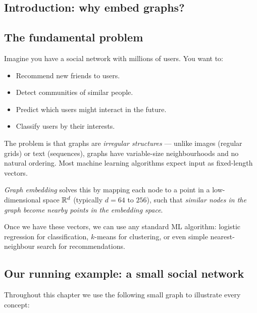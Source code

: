 \begin{notechapter}
\section{Introduction: why embed graphs?}

\subsection{The fundamental problem}

Imagine you have a social network with millions of users. You want to:
\begin{itemize}
    \item Recommend new friends to users.
    \item Detect communities of similar people.
    \item Predict which users might interact in the future.
    \item Classify users by their interests.
\end{itemize}

The problem is that graphs are \emph{irregular structures} --- unlike images (regular grids) or text (sequences), graphs have variable-size neighbourhoods and no natural ordering. Most machine learning algorithms expect input as fixed-length vectors.

\begin{keyidea}
\emph{Graph embedding} solves this by mapping each node to a point in a low-dimensional space $\mathbb{R}^d$ (typically $d = 64$ to $256$), such that \emph{similar nodes in the graph become nearby points in the embedding space}.

Once we have these vectors, we can use any standard ML algorithm: logistic regression for classification, $k$-means for clustering, or even simple nearest-neighbour search for recommendations.
\end{keyidea}

\subsection{Our running example: a small social network}

Throughout this chapter we use the following small graph to illustrate every concept:

\begin{figure}[htbp]
\centering
{}
\end{figure}
\end{notechapter}
